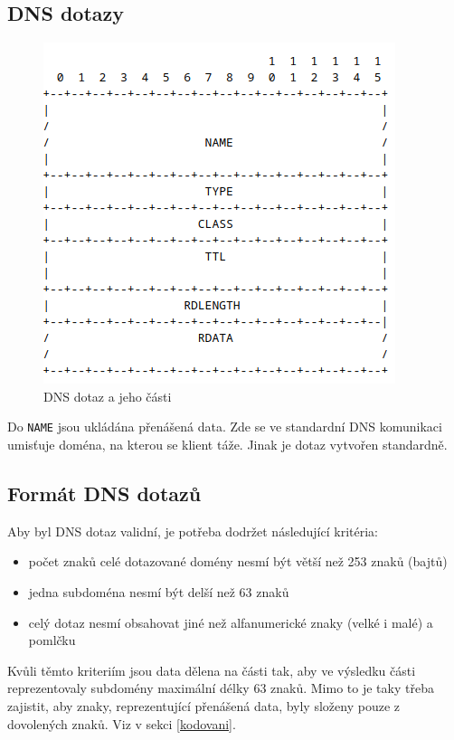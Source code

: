 \documentclass[11pt]{article}
\begin{document}
\subsection{DNS dotazy}
\begin{figure}[H]
\begin{center}
 \includegraphics{img/DNSr.png}
 \caption{DNS dotaz a jeho části}
 \end{center}
 \end{figure}
 Do \texttt{NAME} jsou ukládána přenášená data. Zde se ve standardní DNS komunikaci umisťuje doména, na kterou se klient táže. Jinak je dotaz vytvořen standardně.
\subsection{Formát DNS dotazů}
Aby byl DNS dotaz validní, je potřeba dodržet následující kritéria:
\begin{itemize}
\item  počet znaků celé dotazované domény nesmí být větší než 253 znaků (bajtů)
\item  jedna subdoména nesmí být delší než 63 znaků
\item  celý dotaz nesmí obsahovat jiné než alfanumerické znaky (velké i malé) a pomlčku
\end{itemize}
Kvůli těmto kriteriím jsou data dělena na části tak, aby ve výsledku části reprezentovaly subdomény maximální délky 63 znaků. Mimo to je taky třeba zajistit, aby znaky, reprezentující přenášená data, byly složeny pouze z dovolených znaků. Viz v sekci \ref{kodovani}.
\end{document}
